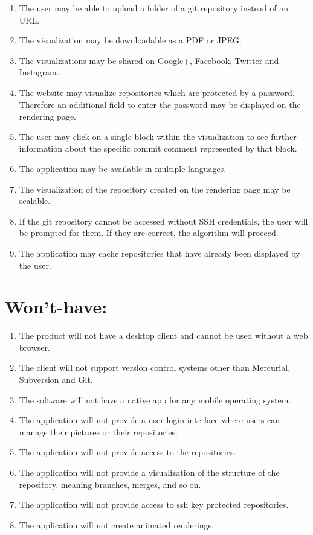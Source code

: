 \documentclass[12pt]{scrartcl}
\begin{document}
\begin{enumerate}
\item The user may be able to upload a folder of a git repository instead of an URL.
\item The visualization may be downloadable as a PDF or JPEG.
\item The visualizations may be shared on Google+, Facebook, Twitter and Instagram.
\item The website may visualize repositories which are protected by a password. Therefore an additional field to enter the password may be displayed on the rendering page.
\item The user may click on a single block within the visualization to see further information about the specific commit comment represented by that block.
\item The application may be available in multiple languages.
\item The visualization of the repository created on the rendering page may be scalable.
\item If the git repository cannot be accessed without SSH credentials, the user will be prompted for them. If they are correct, the algorithm will proceed.
\item The application may cache repositories that have already been displayed by the user.
\end{enumerate}
\section{Won't-have:}
\begin{enumerate}
\item The product will not have a desktop client and cannot be used without a web browser.
\item The client will not support version control systems other than Mercurial, Subversion and Git.
\item The software will not have a native app for any mobile operating system.
\item The application will not provide a user login interface where users can manage their pictures or their repositories.
\item The application will not provide access to the repositories.
\item The application will not provide a visualization of the structure of the repository, meaning branches, merges, and so on.
\item The application will not provide access to ssh key protected repositories.
\item The application will not create animated renderings.
\end{enumerate}
\end{document}
